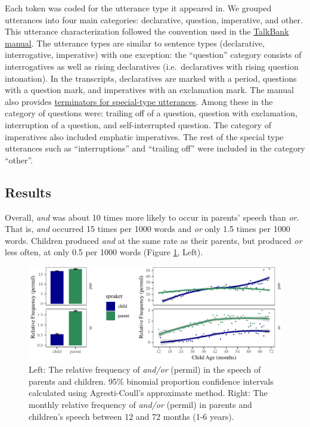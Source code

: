 \documentclass[
  ,man,floatsintext]{apa6}
\begin{document}
Each token was coded for the utterance type it appeared in. We grouped utterances into four main categories: declarative, question, imperative, and other. This utterance characterization followed the convention used in the \href{https://talkbank.org/manuals/CHAT.html\#_Toc486414422}{TalkBank manual}. The utterance types are similar to sentence types (declarative, interrogative, imperative) with one exception: the ``question'' category consists of interrogatives as well as rising declaratives (i.e.~declaratives with rising question intonation). In the transcripts, declaratives are marked with a period, questions with a question mark, and imperatives with an exclamation mark. The manual also provides \href{https://talkbank.org/manuals/CHAT.html\#_Toc486414431}{terminators for special-type utterances}. Among these in the category of questions were: trailing off of a question, question with exclamation, interruption of a question, and self-interrupted question. The category of imperatives also included emphatic imperatives. The rest of the special type utterances such as ``interruptions'' and ``trailing off'' were included in the category ``other''.

\hypertarget{study1results}{%
\subsection{Results}\label{study1results}}

Overall, \emph{and} was about 10 times more likely to occur in parents' speech than \emph{or}. That is, \emph{and} occurred 15 times per 1000 words and \emph{or} only 1.5 times per 1000 words. Children produced \emph{and} at the same rate as their parents, but produced \emph{or} less often, at only 0.5 per 1000 words (Figure \ref{fig:freqPlots}, Left).

\begin{figure}[H]

{\centering \includegraphics{figs/freqPlots-1} 

}

\caption{Left: The relative frequency of \textit{and/or} (permil) in the speech of parents and children. 95\% binomial proportion confidence intervals calculated using Agresti-Coull's approximate method. Right: The monthly relative frequency of \textit{and/or} (permil) in parents and children's speech between 12 and 72 months (1-6 years).}\label{fig:freqPlots}
\end{figure}
\end{document}

